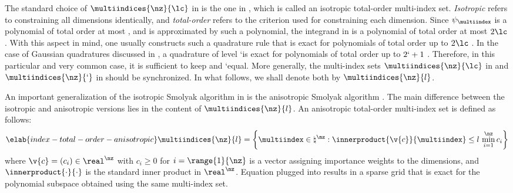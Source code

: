 The standard choice of $\multiindices{\nz}{\lc}$ in  is
the one in , which is called an isotropic
total-order multi-index set. \emph{Isotropic} refers to constraining all
dimensions identically, and \emph{total-order} refers to the criterion used for
constraining each dimension. Since $\psi_{\multiindex}$ is a polynomial of total
order at most \lc, and \g is approximated by such a polynomial, the integrand in
 is a polynomial of total order at most $2 \lc$. With
this aspect in mind, one usually constructs such a quadrature rule that is exact
for polynomials of total order up to $2 \lc$ \cite{eldred2008}. In the case of
Gaussian quadratures discussed in , a quadrature of
level \lq is exact for polynomials of total order up to $2 \lq + 1$
\cite{heiss2008}. Therefore, in this particular and very common case, it is
sufficient to keep \lc and \lq equal. More generally, the multi-index sets
$\multiindices{\nz}{\lc}$ in  and
$\multiindices{\nz}{\lq}$ in  should be synchronized. In
what follows, we shall denote both by $\multiindices{\nz}{l}$.

An important generalization of the isotropic Smolyak algorithm in
 is the anisotropic Smolyak algorithm
\cite{nobile2008}. The main difference between the isotropic and anisotropic
versions lies in the content of $\multiindices{\nz}{l}$. An anisotropic
total-order multi-index set is defined as follows:
\begin{equation} \elab{index-total-order-anisotropic}
  \multiindices{\nz}{l} = \left\{ \multiindex \in \natural^\nz: \innerproduct{\v{c}}{\multiindex} \leq l \, \min_{i = 1}^\nz c_i \right\}
\end{equation}
where $\v{c} = (c_i) \in \real^\nz$ with $c_i \geq 0$ for $i = \range{1}{\nz}$
is a vector assigning importance weights to the dimensions, and
$\innerproduct{\cdot}{\cdot}$ is the standard inner product in $\real^\nz$.
Equation  plugged into
 results in a sparse grid that is exact for the
polynomial subspace obtained using the same multi-index set.

